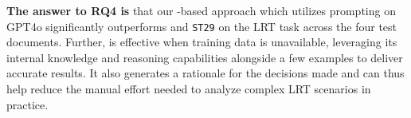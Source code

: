 


 



\begin{tcolorbox}[arc=1mm,width=\columnwidth,
                  top=0mm,left=0mm,  right=0mm, bottom=0mm,
                  boxrule=1pt, colback=violet!15!white,colframe=white, breakable]
\textbf{The answer to RQ4 is} that our \RICE-based approach which utilizes prompting on GPT4o significantly outperforms \kashif and \texttt{ST29} on the LRT task across the four test documents. Further, \RICE is effective when training data is unavailable, leveraging its internal knowledge and reasoning capabilities alongside a few examples to deliver accurate results. It also generates a rationale for the decisions made and can thus help reduce the manual effort needed to analyze complex LRT scenarios in practice. %
\end{tcolorbox}